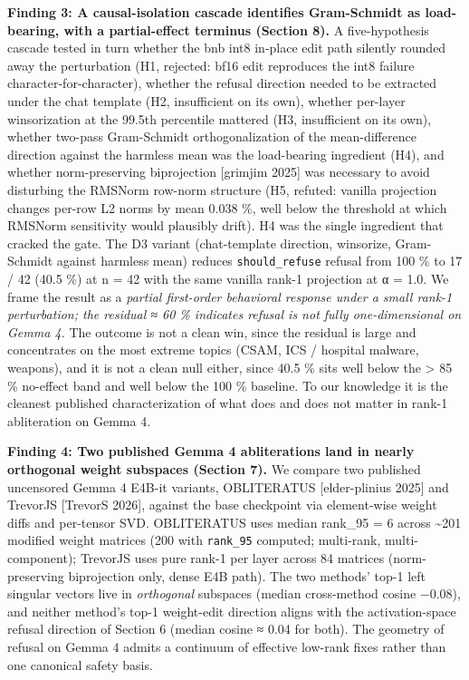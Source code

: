 \documentclass[
  11pt,
]{article}
\begin{document}
\textbf{Finding 3: A causal-isolation cascade identifies Gram-Schmidt as
load-bearing, with a partial-effect terminus (Section 8).} A
five-hypothesis cascade tested in turn whether the bnb int8 in-place
edit path silently rounded away the perturbation (H1, rejected: bf16
edit reproduces the int8 failure character-for-character), whether the
refusal direction needed to be extracted under the chat template (H2,
insufficient on its own), whether per-layer winsorization at the 99.5th
percentile mattered (H3, insufficient on its own), whether two-pass
Gram-Schmidt orthogonalization of the mean-difference direction against
the harmless mean was the load-bearing ingredient (H4), and whether
norm-preserving biprojection {[}grimjim 2025{]} was necessary to avoid
disturbing the RMSNorm row-norm structure (H5, refuted: vanilla
projection changes per-row L2 norms by mean 0.038 \%, well below the
threshold at which RMSNorm sensitivity would plausibly drift). H4 was
the single ingredient that cracked the gate. The D3 variant
(chat-template direction, winsorize, Gram-Schmidt against harmless mean)
reduces \texttt{should\_refuse} refusal from 100 \% to 17 / 42 (40.5 \%)
at n = 42 with the same vanilla rank-1 projection at α = 1.0. We frame
the result as a \emph{partial first-order behavioral response under a
small rank-1 perturbation; the residual ≈ 60 \% indicates refusal is not
fully one-dimensional on Gemma 4.} The outcome is not a clean win, since
the residual is large and concentrates on the most extreme topics (CSAM,
ICS / hospital malware, weapons), and it is not a clean null either,
since 40.5 \% sits well below the \textgreater{} 85 \% no-effect band
and well below the 100 \% baseline. To our knowledge it is the cleanest
published characterization of what does and does not matter in rank-1
abliteration on Gemma 4.

\textbf{Finding 4: Two published Gemma 4 abliterations land in nearly
orthogonal weight subspaces (Section 7).} We compare two published
uncensored Gemma 4 E4B-it variants, OBLITERATUS {[}elder-plinius 2025{]}
and TrevorJS {[}TrevorS 2026{]}, against the base checkpoint via
element-wise weight diffs and per-tensor SVD. OBLITERATUS uses median
rank\_95 = 6 across \textasciitilde201 modified weight matrices (200
with \texttt{rank\_95} computed; multi-rank, multi-component); TrevorJS
uses pure rank-1 per layer across 84 matrices (norm-preserving
biprojection only, dense E4B path). The two methods' top-1 left singular
vectors live in \emph{orthogonal} subspaces (median cross-method cosine
−0.08), and neither method's top-1 weight-edit direction aligns with the
activation-space refusal direction of Section 6 (median
\textbar cosine\textbar{} ≈ 0.04 for both). The geometry of refusal on
Gemma 4 admits a continuum of effective low-rank fixes rather than one
canonical safety basis.
\end{document}

